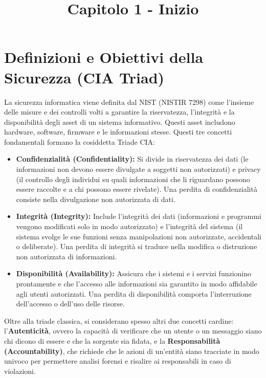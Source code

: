 \documentclass{article}
\title{Capitolo 1 - Inizio}
\author{}
\date{}
\begin{document}
\maketitle

\section{Definizioni e Obiettivi della Sicurezza (CIA Triad)}
La sicurezza informatica viene definita dal NIST (NISTIR 7298) come l'insieme delle misure e dei controlli volti a garantire la riservatezza, l'integrità e la disponibilità degli asset di un sistema informativo. Questi asset includono hardware, software, firmware e le informazioni stesse. Questi tre concetti fondamentali formano la cosiddetta Triade CIA:

\begin{itemize}
    \item \textbf{Confidenzialità (Confidentiality):} Si divide in riservatezza dei dati (le informazioni non devono essere divulgate a soggetti non autorizzati) e privacy (il controllo degli individui su quali informazioni che li riguardano possono essere raccolte e a chi possono essere rivelate). Una perdita di confidenzialità consiste nella divulgazione non autorizzata di dati.
    \item \textbf{Integrità (Integrity):} Include l'integrità dei dati (informazioni e programmi vengono modificati solo in modo autorizzato) e l'integrità del sistema (il sistema svolge le sue funzioni senza manipolazioni non autorizzate, accidentali o deliberate). Una perdita di integrità si traduce nella modifica o distruzione non autorizzata di informazioni.
    \item \textbf{Disponibilità (Availability):} Assicura che i sistemi e i servizi funzionino prontamente e che l'accesso alle informazioni sia garantito in modo affidabile agli utenti autorizzati. Una perdita di disponibilità comporta l'interruzione dell'accesso o dell'uso delle risorse.
\end{itemize}

Oltre alla triade classica, si considerano spesso altri due concetti cardine: l'\textbf{Autenticità}, ovvero la capacità di verificare che un utente o un messaggio siano chi dicono di essere e che la sorgente sia fidata, e la \textbf{Responsabilità (Accountability)}, che richiede che le azioni di un'entità siano tracciate in modo univoco per permettere analisi forensi e risalire ai responsabili in caso di violazioni.
\end{document}

